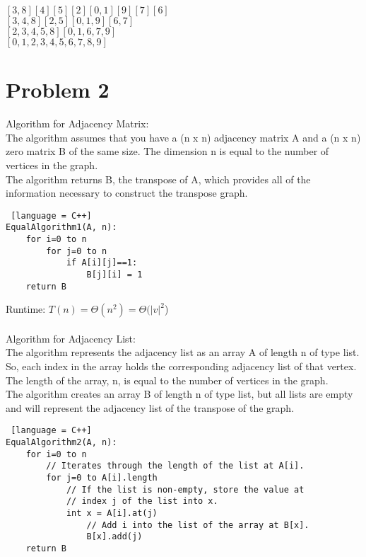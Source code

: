 \documentclass[14pt]{extarticle}
\begin{document}
$[3, 8] [4] [5] [2] [0, 1] [9] [7] [6]$\\

$[3, 4, 8] [2, 5] [0, 1, 9] [6, 7]$\\

$[2, 3, 4, 5, 8] [0, 1, 6, 7, 9]$\\

$[0, 1, 2, 3, 4, 5, 6, 7, 8, 9]$\\


\section*{Problem 2}
Algorithm for Adjacency Matrix: \\
The algorithm assumes that you have a (n x n) adjacency matrix A and a (n x n) zero matrix B of the same size. The dimension n is equal to the number of vertices in the graph. \\
The algorithm returns B, the transpose of A, which provides all of the information necessary to construct the transpose graph. \\

\begin{lstlisting} [language = C++]
EqualAlgorithm1(A, n):
	for i=0 to n
		for j=0 to n
			if A[i][j]==1:
				B[j][i] = 1
	return B
\end{lstlisting}

Runtime: \(T(n) = \Theta(n^2) = \Theta(|v|^2\)) \\ \\ 

Algorithm for Adjacency List: \\
The algorithm represents the adjacency list as an array A of length n of type list. So, each index in the array holds the corresponding adjacency list of that vertex. \\
The length of the array, n, is equal to the number of vertices in the graph.\\
The algorithm creates an array B of length n of type list, but all lists are empty and will represent the adjacency list of the transpose of the graph. \\ 

\begin{lstlisting} [language = C++]
EqualAlgorithm2(A, n):
	for i=0 to n
		// Iterates through the length of the list at A[i].
		for j=0 to A[i].length
			// If the list is non-empty, store the value at 
			// index j of the list into x.
			int x = A[i].at(j)
				// Add i into the list of the array at B[x].
				B[x].add(j)
	return B
\end{lstlisting}
\end{document}
